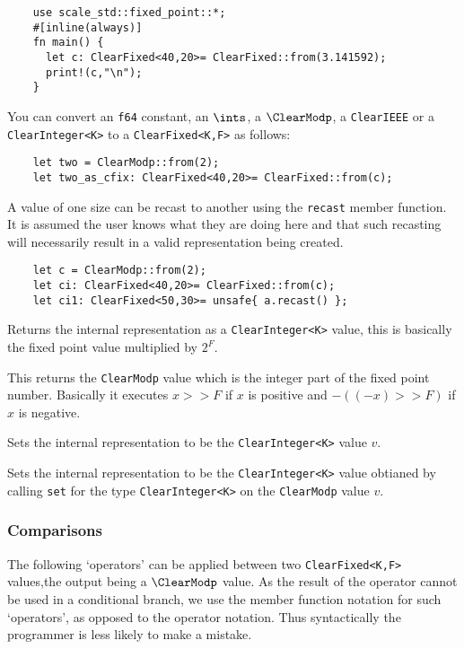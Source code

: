 \begin{lstlisting}
    use scale_std::fixed_point::*;
    #[inline(always)]
    fn main() {
      let c: ClearFixed<40,20>= ClearFixed::from(3.141592);
      print!(c,"\n");
    }
\end{lstlisting}

You can convert an \verb|f64| constant, an $\ints$,  a $\ClearModp$,
a \verb|ClearIEEE| or a \verb|ClearInteger<K>| to a \verb|ClearFixed<K,F>| as follows:
\begin{lstlisting}
    let two = ClearModp::from(2);
    let two_as_cfix: ClearFixed<40,20>= ClearFixed::from(c);
\end{lstlisting}

A value of one size can be recast to another using the \verb|recast|
member function. It is assumed the user knows what they are doing here
and that such recasting will necessarily result in a valid representation
being created.
\begin{lstlisting}
    let c = ClearModp::from(2);
    let ci: ClearFixed<40,20>= ClearFixed::from(c);
    let ci1: ClearFixed<50,30>= unsafe{ a.recast() };
\end{lstlisting}

Returns the internal representation as a \verb|ClearInteger<K>| value,
this is basically the fixed point value multiplied by $2^F$.

This returns the \verb|ClearModp| value which is the integer part
of the fixed point number.
Basically it executes $x >> F$ if $x$ is positive and
$-((-x)>>F)$ if $x$ is negative.

Sets the internal representation to be the \verb|ClearInteger<K>| value $v$.

Sets the internal representation to be the \verb|ClearInteger<K>| value obtianed by calling \verb|set| for the type
\verb|ClearInteger<K>| on the \verb|ClearModp| value $v$.


\subsubsection{Comparisons}
The following `operators' can be applied between two \verb|ClearFixed<K,F>|
values,the output being a $\ClearModp$ value.
As the result of the operator cannot be used in a conditional branch,
we use the member function notation for such `operators', as opposed
to the operator notation. Thus syntactically the programmer is less
likely to make a mistake.

